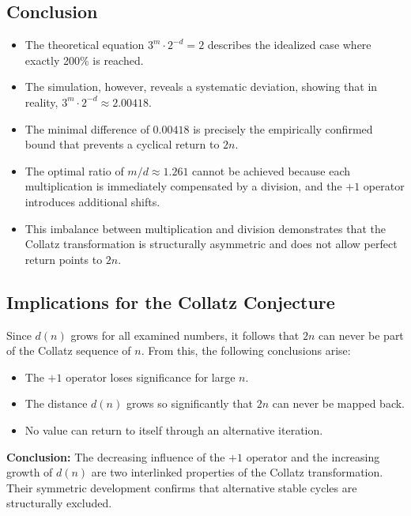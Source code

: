 \documentclass[a4paper,12pt]{article}
\begin{document}
\subsection{Conclusion}  

\begin{itemize}
    \item The theoretical equation \( 3^m \cdot 2^{-d} = 2 \) describes the idealized case where exactly 200\% is reached.  
    \item The simulation, however, reveals a systematic deviation, showing that in reality, \( 3^m \cdot 2^{-d} \approx 2.00418 \).  
    \item The minimal difference of \( 0.00418 \) is precisely the empirically confirmed bound that prevents a cyclical return to \( 2n \).  
    \item The optimal ratio of \( m/d \approx 1.261 \) cannot be achieved because each multiplication is immediately compensated by a division, and the \( +1 \) operator introduces additional shifts.  
    \item This imbalance between multiplication and division demonstrates that the Collatz transformation is structurally asymmetric and does not allow perfect return points to \( 2n \).  
\end{itemize}



\subsection{Implications for the Collatz Conjecture}

Since \( d(n) \) grows for all examined numbers, it follows that \( 2n \) can never be part of the Collatz sequence of \( n \). From this, the following conclusions arise:

\begin{itemize}
    \item The \( +1 \) operator loses significance for large \( n \).
    \item The distance \( d(n) \) grows so significantly that \( 2n \) can never be mapped back.
    \item No value can return to itself through an alternative iteration.
\end{itemize}

\textbf{Conclusion:} The decreasing influence of the \( +1 \) operator and the increasing growth of \( d(n) \) are two interlinked properties of the Collatz transformation. Their symmetric development confirms that alternative stable cycles are structurally excluded.
\end{document}
